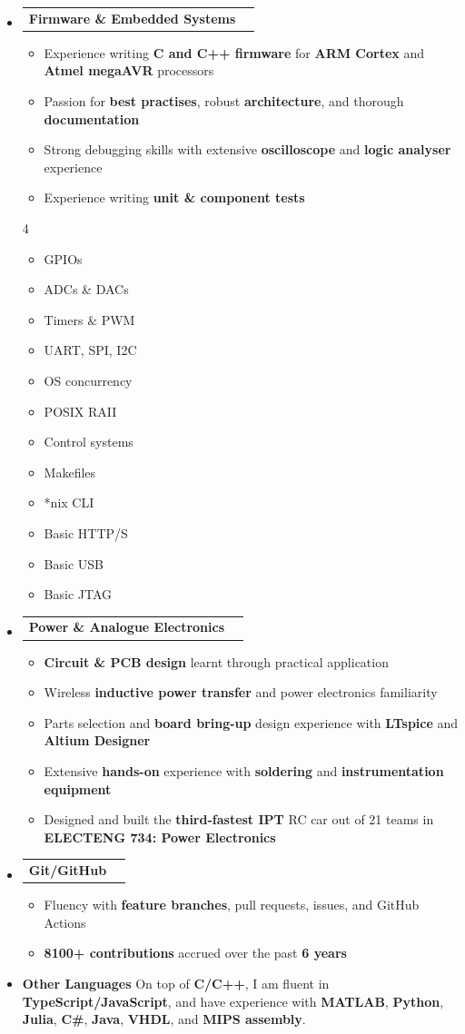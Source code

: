 \documentclass[11pt,a4paper]{article}[leftmargin=*]
\makeatletter
\def \entryspacing {-0pt}
\def \bulletstylei {\faAngleRight\hspace{-4.5pt}}
\newcommand{\resumeEntryStart}{\begin{itemize}[leftmargin=2.5mm]}
\newcommand{\resumeEntryEnd}{\end{itemize}\vspace{\entryspacing}}
\newcommand{\resumeItemListStart}{\begin{itemize}[leftmargin=4.5mm]}
\newcommand{\resumeItemListEnd}{\end{itemize}}
\newcommand{\resumeItemListStartColumns}[2][-0.5]{\vspace*{#1\multicolsep}
\begin{multicols}{#2}\begin{itemize}[leftmargin=4.5mm]}
\newcommand{\resumeItemListEndColumns}[1][-1]{\end{itemize}\end{multicols}\vspace*{#1\multicolsep}}
\newcommand{\resumeItem}[2][\bulletstylei]{
  \item[\small#1]\small{
    {#2 \vspace{-2pt}}
  }
}
\newcommand{\resumeEntryTD}[2]{
  \vspace{-1pt}\item[]
    \begin{tabularx}{0.97\textwidth}{X@{\hspace{60pt}}r}
      \textbf{\color{primary}#1} & {\firabook\color{accent}\small#2} \\
    \end{tabularx}\vspace{-6pt}
}
\newcommand{\resumeEntryS}[2]{
  \item[]\small{
    \textbf{\color{primary}#1 }{ #2 \vspace{-4pt}}
  }
}
\newcommand{\resumeBf}[1]{\small\textbf{\color{halfbold}#1}}
\makeatother
\begin{document}
\resumeEntryStart
\resumeEntryTD
{Firmware \& Embedded Systems}{}
\resumeItemListStart
\resumeItem {Experience writing \resumeBf{C and C++ firmware} for \resumeBf{ARM Cortex} and \resumeBf{Atmel megaAVR} processors}
\resumeItem {Passion for \resumeBf{best practises}, robust \resumeBf{architecture}, and thorough \resumeBf{documentation}}
\resumeItem {Strong debugging skills with extensive \resumeBf{oscilloscope} and \resumeBf{logic analyser} experience}
\resumeItem {Experience writing \resumeBf{unit \& component tests}}
\resumeItemListEnd
\resumeItemListStartColumns[-0.5]{4}
\resumeItem {GPIOs}
\resumeItem {ADCs \& DACs}
\resumeItem {Timers \& PWM}
\resumeItem {UART, SPI, I2C}
\resumeItem {OS concurrency}
\resumeItem {POSIX RAII}
\resumeItem {Control systems}
\resumeItem {Makefiles}
\resumeItem {*nix CLI}
\resumeItem {Basic HTTP/S}
\resumeItem {Basic USB}
\resumeItem {Basic JTAG}
\resumeItemListEndColumns
\resumeEntryEnd

\resumeEntryStart
\resumeEntryTD
{Power \& Analogue Electronics}{}
\resumeItemListStart
\resumeItem {\resumeBf{Circuit \& PCB design} learnt through practical application}
\resumeItem {Wireless \resumeBf{inductive power transfer} and power electronics familiarity}
\resumeItem {Parts selection and \resumeBf{board bring-up} design experience with \resumeBf{LTspice} and \resumeBf{Altium Designer}}
\resumeItem {Extensive \resumeBf{hands-on} experience with \resumeBf{soldering} and \resumeBf{instrumentation equipment}}
\resumeItem {Designed and built the \resumeBf{third-fastest IPT} RC car out of 21 teams in \resumeBf{ELECTENG 734: Power Electronics}}
\resumeItemListEnd
\resumeEntryEnd

\resumeEntryStart
\resumeEntryTD
{Git/GitHub}{}
\resumeItemListStart
\resumeItem {Fluency with \resumeBf{feature branches}, pull requests, issues, and GitHub Actions}
\resumeItem {\resumeBf{8100+ contributions} accrued over the past \resumeBf{6 years}}
\resumeItemListEnd
\resumeEntryEnd

\resumeEntryStart
\resumeEntryS
{Other Languages}{On top of \resumeBf{C/C++}, I am fluent in \resumeBf{TypeScript/JavaScript}, and have experience with \resumeBf{MATLAB}, \resumeBf{Python}, \resumeBf{Julia}, \resumeBf{C\#}, \resumeBf{Java}, \resumeBf{VHDL}, and \resumeBf{MIPS assembly}.}
\resumeEntryEnd
\end{document}
